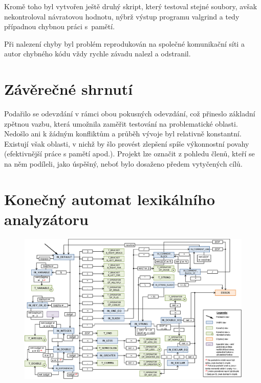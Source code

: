 \documentclass[12pt,a4paper,titlepage,final]{article}
\begin{document}
Kromě toho byl vytvořen ještě druhý skript, který testoval stejné soubory, 
avšak ne\-kontro\-lo\-val návratovou hodnotu, nýbrž výstup programu valgrind a 
tedy případnou chybnou práci s~pamětí.

Při nalezení chyby byl problém reprodukován na společné komunikační síti a 
autor chybného kódu vždy rychle závadu nalezl a odstranil.

\section{Závěrečné shrnutí} \label{shrnuti}
Podařilo se odevzdání v rámci obou pokusných odevzdání, což přineslo základní 
zpětnou vazbu, která umožnila zaměřit testování na problematické oblasti. 
Nedošlo ani k žádným konfliktům a průběh vývoje byl relativně konstantní. 
Existují však oblasti, v nichž by šlo provést zlepšení spíše výkonnostní 
povahy (efektivnější práce s pamětí apod.). Projekt lze označit z pohledu členů,
kteří se na něm podíleli, jako úspěšný, neboť bylo dosaženo předem vytyčených cílů. 

\newpage
\appendix

\section{Konečný automat lexikálního analyzátoru} \label{scanner_graf}
\begin{figure}[H]
\begin{center}
  \includegraphics[angle = 90, scale = 0.75]{img/scanner.eps}
\end{center}
\end{figure}
\end{document}
